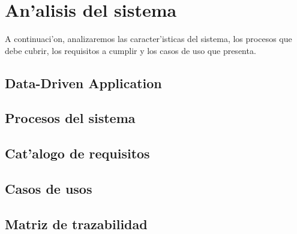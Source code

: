 \chapter{An'alisis del sistema}\label{cap3}
A continuaci'on, analizaremos las caracter'isticas del sistema, los procesos que debe cubrir, los requisitos a cumplir y los casos de uso que presenta.
\section{Data-Driven Application}\label{sec:datadriven}


\section{Procesos del sistema}\label{sec:procesos}


\section{Cat'alogo de requisitos}\label{sec:requisitos}


\section{Casos de usos}\label{sec:casos_de_uso}


\section{Matriz de trazabilidad}\label{sec:matriz}


